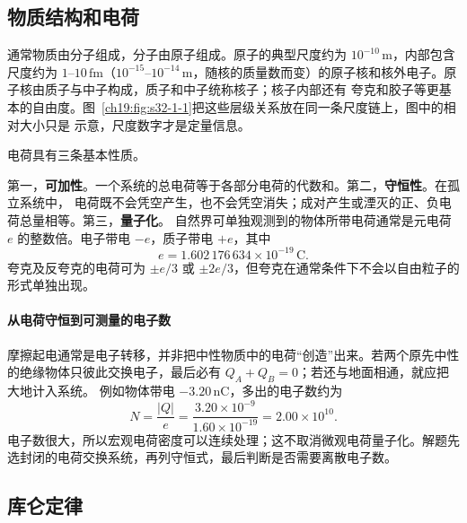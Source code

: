 \subsection{物质结构和电荷}


通常物质由分子组成，分子由原子组成。原子的典型尺度约为 $10^{-10}\,\mathrm m$，内部包含尺度约为
$1$--$10\,\mathrm{fm}$（$10^{-15}$--$10^{-14}\,\mathrm m$，随核的质量数而变）的原子核和核外电子。原子核由质子与中子构成，质子和中子统称核子；核子内部还有
夸克和胶子等更基本的自由度。图~\ref{ch19:fig:s32-1-1}把这些层级关系放在同一条尺度链上，图中的相对大小只是
示意，尺度数字才是定量信息。

\par\noindent\begin{minipage}{\linewidth}
\matterScaleFigure
{}\label{ch19:fig:s32-1-1}
\end{minipage}\par\medskip

电荷具有三条基本性质。

第一，\textbf{可加性}。一个系统的总电荷等于各部分电荷的代数和。第二，\textbf{守恒性}。在孤立系统中，
电荷既不会凭空产生，也不会凭空消失；成对产生或湮灭的正、负电荷总量相等。第三，\textbf{量子化}。
自然界可单独观测到的物体所带电荷通常是元电荷 $e$ 的整数倍。电子带电 $-e$，质子带电 $+e$，其中
\begin{equation}
  \boxed{e=1.602\,176\,634\times10^{-19}\,\mathrm C}.
\end{equation}
夸克及反夸克的电荷可为 $\pm e/3$ 或 $\pm2e/3$，但夸克在通常条件下不会以自由粒子的形式单独出现。


\paragraph{从电荷守恒到可测量的电子数}
摩擦起电通常是电子转移，并非把中性物质中的电荷“创造”出来。若两个原先中性的绝缘物体只彼此交换电子，最后必有 $Q_A+Q_B=0$；若还与地面相通，就应把大地计入系统。
例如物体带电 $-3.20\,\mathrm{nC}$，多出的电子数约为
\[
 N=\frac{|Q|}{e}=\frac{3.20\times10^{-9}}{1.60\times10^{-19}}=2.00\times10^{10}.
\]
电子数很大，所以宏观电荷密度可以连续处理；这不取消微观电荷量子化。解题先选封闭的电荷交换系统，再列守恒式，最后判断是否需要离散电子数。


\subsection{库仑定律}


